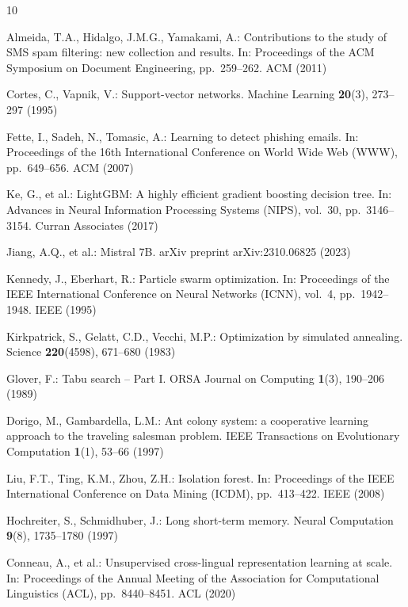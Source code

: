 \documentclass{llncs}
\begin{document}
\begin{thebibliography}{10}

Almeida, T.A., Hidalgo, J.M.G., Yamakami, A.:
Contributions to the study of SMS spam filtering:
new collection and results.
In: Proceedings of the ACM Symposium on Document Engineering,
pp.~259--262. ACM (2011)

Cortes, C., Vapnik, V.:
Support-vector networks.
Machine Learning \textbf{20}(3), 273--297 (1995)

Fette, I., Sadeh, N., Tomasic, A.:
Learning to detect phishing emails.
In: Proceedings of the 16th International Conference on
World Wide Web (WWW), pp.~649--656. ACM (2007)

Ke, G., et al.:
LightGBM: A highly efficient gradient boosting decision tree.
In: Advances in Neural Information Processing Systems (NIPS),
vol.~30, pp.~3146--3154. Curran Associates (2017)

Jiang, A.Q., et al.:
Mistral 7B.
arXiv preprint arXiv:2310.06825 (2023)

Kennedy, J., Eberhart, R.:
Particle swarm optimization.
In: Proceedings of the IEEE International Conference on
Neural Networks (ICNN), vol.~4, pp.~1942--1948. IEEE (1995)

Kirkpatrick, S., Gelatt, C.D., Vecchi, M.P.:
Optimization by simulated annealing.
Science \textbf{220}(4598), 671--680 (1983)

Glover, F.:
Tabu search -- Part I.
ORSA Journal on Computing \textbf{1}(3), 190--206 (1989)

Dorigo, M., Gambardella, L.M.:
Ant colony system: a cooperative learning approach to the
traveling salesman problem.
IEEE Transactions on Evolutionary Computation
\textbf{1}(1), 53--66 (1997)

Liu, F.T., Ting, K.M., Zhou, Z.H.:
Isolation forest.
In: Proceedings of the IEEE International Conference on
Data Mining (ICDM), pp.~413--422. IEEE (2008)

Hochreiter, S., Schmidhuber, J.:
Long short-term memory.
Neural Computation \textbf{9}(8), 1735--1780 (1997)

Conneau, A., et al.:
Unsupervised cross-lingual representation learning at scale.
In: Proceedings of the Annual Meeting of the Association
for Computational Linguistics (ACL),
pp.~8440--8451. ACL (2020)

\end{thebibliography}
\end{document}
